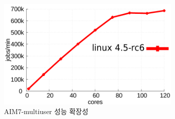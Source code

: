 




\begin{figure}[h]
    \centering
    \includegraphics[width=0.8\textwidth]{graph/aim7_default}
    \caption{AIM7-multiuser 성능 확장성}
  \label{fig:aim7_default}
\end{figure}

